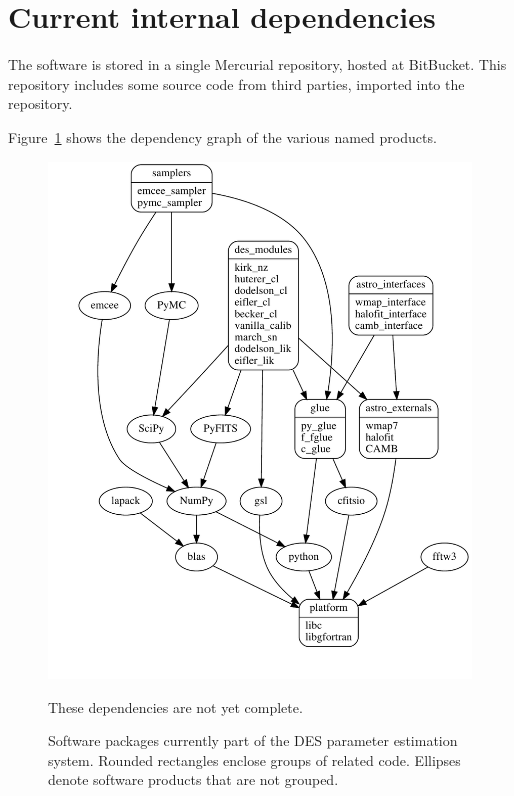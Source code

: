 \documentclass[draftmode,draftwater]{memarticle}
\newcommand{\despipe}{\name{des-pipe}\xspace}
\begin{document}
\section{Current internal dependencies}

The \despipe software is stored in a single
Mercurial\cite{mercurial} repository, hosted at
BitBucket\cite{bitbucket}. This repository includes some source code
from third parties, imported into the repository.

Figure~\ref{fig:astropackages} shows the dependency graph of the various
named products.

\begin{figure}
  \centering
  \includegraphics[width=\textwidth]{astro_packages}
  \begin{fixme}
    These dependencies are not yet complete.
  \end{fixme}
  \caption{Software packages currently part of the DES parameter
    estimation system. Rounded rectangles enclose groups of related
    code. Ellipses denote software products that are not grouped.}
  \label{fig:astropackages}
\end{figure}
\end{document}
